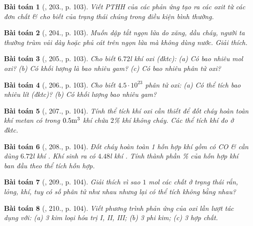 \documentclass{article}
\newtheorem{baitoan}{Bài toán}
\begin{document}
\begin{baitoan}[\cite{An_400_BT_Hoa_Hoc_8_2020}, 203., p. 103]
	Viết PTHH của các phản ứng tạo ra các oxit \emph{} từ các đơn chất \& cho biết của trạng thái chúng trong điều kiện bình thường.
\end{baitoan}

\begin{baitoan}[\cite{An_400_BT_Hoa_Hoc_8_2020}, 204., p. 103]
	Muốn dập tắt ngọn lửa do xăng, dầu cháy, người ta thường trùm vải dày hoặc phủ cát trên ngọn lửa mà không dùng nước. Giải thích.
\end{baitoan}

\begin{baitoan}[\cite{An_400_BT_Hoa_Hoc_8_2020}, 205., p. 103]
	Cho biết $6.72$\emph{l} khí oxi (đktc): (a) Có bao nhiêu mol oxi? (b) Có khối lượng là bao nhiêu gam? (c) Có bao nhiêu phân tử oxi?
\end{baitoan}

\begin{baitoan}[\cite{An_400_BT_Hoa_Hoc_8_2020}, 206., p. 103]
	Cho biết $4.5\cdot10^{23}$ phân tử oxi: (a) Có thể tích bao nhiêu lít (đktc)? (b) Có khối lượng bao nhiêu gam?
\end{baitoan}

\begin{baitoan}[\cite{An_400_BT_Hoa_Hoc_8_2020}, 207., p. 104]
	Tính thể tích khí oxi cần thiết để đốt cháy hoàn toàn khí metan \emph{} có trong $0.5{\rm m}^3$ khí chứa $2$\% khí không cháy. Các thể tích khí đo ở đktc.
\end{baitoan}

\begin{baitoan}[\cite{An_400_BT_Hoa_Hoc_8_2020}, 208., p. 104]
	Đốt cháy hoàn toàn 1 hỗn hợp khí gồm có \emph{CO} \& \emph{} cần dùng $6.72$\emph{l} khí \emph{}. Khí sinh ra có $4.48$\emph{l} khí \emph{}. Tính thành phần \% của hỗn hợp khí ban đầu theo thể tích hỗn hợp.
\end{baitoan}

\begin{baitoan}[\cite{An_400_BT_Hoa_Hoc_8_2020}, 209., p. 104]
	Giải thích vì sao $1$ \emph{mol} các chất ở trạng thái rắn, lỏng, khí, tuy có số phân tử như nhau nhưng lại có thể tích không bằng nhau?
\end{baitoan}

\begin{baitoan}[\cite{An_400_BT_Hoa_Hoc_8_2020}, 210., p. 104]
	Viết phương trình phản ứng của oxi lần lượt tác dụng với: (a) 3 kim loại hóa trị I, II, III; (b) 3 phi kim; (c) 3 hợp chất.
\end{baitoan}
\end{document}

